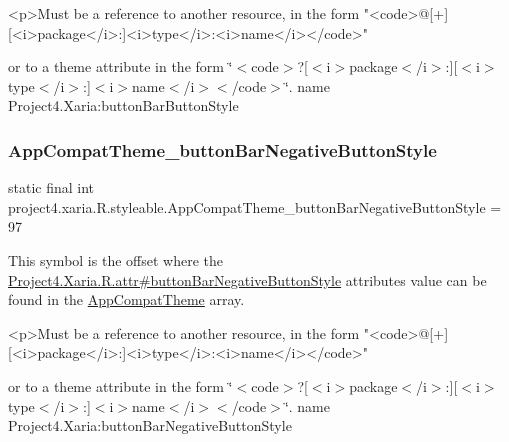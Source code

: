 \begin{DoxyVerb}      <p>Must be a reference to another resource, in the form "<code>@[+][<i>package</i>:]<i>type</i>:<i>name</i></code>"
\end{DoxyVerb}
 or to a theme attribute in the form \char`\"{}$<$code$>$?\mbox{[}$<$i$>$package$<$/i$>$\+:\mbox{]}\mbox{[}$<$i$>$type$<$/i$>$\+:\mbox{]}$<$i$>$name$<$/i$>$$<$/code$>$\char`\"{}.  name Project4.\+Xaria\+:button\+Bar\+Button\+Style \mbox{\label{classproject4_1_1xaria_1_1R_1_1styleable_a88fbb3d960b1618f126b09fb5d07f435}} 
\subsubsection{\texorpdfstring{App\+Compat\+Theme\+\_\+button\+Bar\+Negative\+Button\+Style}{AppCompatTheme\_buttonBarNegativeButtonStyle}}
{\footnotesize\ttfamily static final int project4.\+xaria.\+R.\+styleable.\+App\+Compat\+Theme\+\_\+button\+Bar\+Negative\+Button\+Style = 97\hspace{0.3cm}{\ttfamily [static]}}

This symbol is the offset where the \hyperlink{}{Project4.\+Xaria.\+R.\+attr\#button\+Bar\+Negative\+Button\+Style} attribute\textquotesingle{}s value can be found in the \hyperlink{classproject4_1_1xaria_1_1R_1_1styleable_aad8bec413e2350f9404e6ff0e831a85d}{App\+Compat\+Theme} array.

\begin{DoxyVerb}      <p>Must be a reference to another resource, in the form "<code>@[+][<i>package</i>:]<i>type</i>:<i>name</i></code>"
\end{DoxyVerb}
 or to a theme attribute in the form \char`\"{}$<$code$>$?\mbox{[}$<$i$>$package$<$/i$>$\+:\mbox{]}\mbox{[}$<$i$>$type$<$/i$>$\+:\mbox{]}$<$i$>$name$<$/i$>$$<$/code$>$\char`\"{}.  name Project4.\+Xaria\+:button\+Bar\+Negative\+Button\+Style \mbox{\label{classproject4_1_1xaria_1_1R_1_1styleable_ad75543e499457698c2fe0f0bd7349a82}} 
